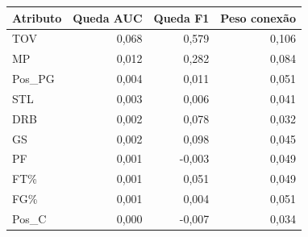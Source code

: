 \begin{tabular}{lrrr}
\toprule
Atributo & Queda AUC & Queda F1 & Peso conexão \\
\midrule
TOV & 0,068 & 0,579 & 0,106 \\
MP & 0,012 & 0,282 & 0,084 \\
Pos\_PG & 0,004 & 0,011 & 0,051 \\
STL & 0,003 & 0,006 & 0,041 \\
DRB & 0,002 & 0,078 & 0,032 \\
GS & 0,002 & 0,098 & 0,045 \\
PF & 0,001 & -0,003 & 0,049 \\
FT\% & 0,001 & 0,051 & 0,049 \\
FG\% & 0,001 & 0,004 & 0,051 \\
Pos\_C & 0,000 & -0,007 & 0,034 \\
\bottomrule
\end{tabular}
